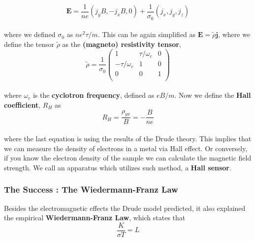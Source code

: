 \documentclass[paper=a4, fontsize=11pt]{scrartcl}
\begin{document}
\begin{equation}\nonumber
\mathbf{E} = \frac{1}{ne} \left( j_y B , -j_x B , 0 \right) + \frac{1}{\sigma_0} (j_x,j_y,j_z) 
\end{equation}\\

where we defined $\sigma_0$ as $ ne^2\tau/m $. This can be again simplified as $\mathbf{E} = \tilde{\rho} \mathbf{j}$, where we define the tensor $\tilde{\rho}$ as the \textbf{(magneto) resistivity tensor}, \\

\begin{equation}\nonumber
	\tilde{\rho} = \frac{1}{\sigma_0}
	\begin{pmatrix}
	1 & \tau/\omega_c & 0 \\
	-\tau/\omega_c & 1 & 0\\
	0 & 0 & 1 \\
	\end{pmatrix}
\end{equation}\\

where $\omega_c$ is the \textbf{cyclotron frequency}, defined as $eB/m$. Now we define the \textbf{Hall coefficient}, $R_H$ as \\

\begin{equation}\nonumber
	R_H = \frac{\rho_{yx}}{B} = -\frac{B}{ne}
\end{equation}\\

where the last equation is using the results of the Drude theory. This implies that we can measure the density of electrons in a metal via Hall effect. Or conversely, if you know the electron density of the sample we can calculate the magnetic field strength. We call an apparatus which utilizes such method, a \textbf{Hall sensor}.

\vspace{0.15in}
\subsubsection{The Success : The Wiedermann-Franz Law}
\vspace{0.15in}

Besides the electromagnetic effects the Drude model predicted, it also explained the empirical \textbf{Wiedermann-Franz Law}, which states that\\

\begin{equation}\nonumber
	\frac{K}{\sigma T} = L
\end{equation} \\
\end{document}
